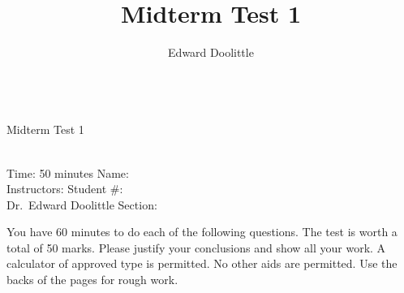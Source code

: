 \documentclass[12pt]{article}
\title{Midterm Test 1}
\author{Edward Doolittle}
\begin{document}
\thispagestyle{plain}

\begin{center}
  \quad\\
  \LARGE{Midterm Test 1}
\end{center}

\begin{flushleft}
\quad\\
Time: 50 minutes                \hfill       Name: \underline{\hspace{2in}}  \\
Instructors:                    \hfill Student \#: \underline{\hspace{2in}}  \\
\quad Dr.\ Edward Doolittle     \hfill    Section: \underline{\hspace{2in}}  \\
\end{flushleft}


\noindent
You have 60 minutes to do each of the following questions.
The test is worth a total of 50 marks.
Please justify your conclusions and
show all your work.
A calculator of approved type is permitted.  No other aids
are permitted.
Use the backs of the pages for rough work.
\end{document}
